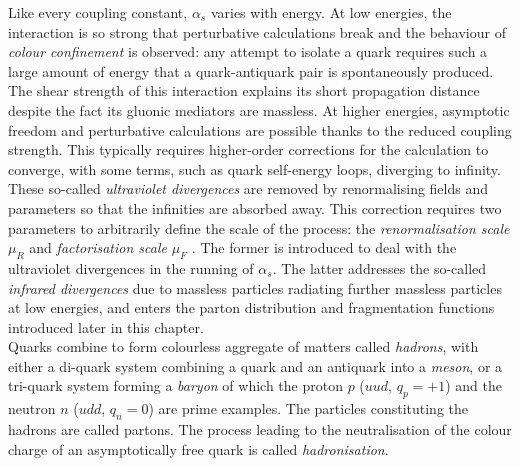 Like every coupling constant, $\alpha_s$ varies with energy. At low energies, the interaction is so strong that perturbative calculations break and the behaviour of \textit{colour confinement} is observed: any attempt to isolate a quark requires such a large amount of energy that a quark-antiquark pair is spontaneously produced. The shear strength of this interaction explains its short propagation distance despite the fact its gluonic mediators are massless. At higher energies, asymptotic freedom and perturbative calculations are possible thanks to the reduced coupling strength. This typically requires higher-order corrections for the calculation to converge, with some terms, such as quark self-energy loops, diverging to infinity. These so-called \textit{ultraviolet divergences} are removed by renormalising fields and parameters so that the infinities are absorbed away. This correction requires two parameters to arbitrarily define the scale of the process: the \textit{renormalisation scale} $\mu_R$ and \textit{factorisation scale} $\mu_F$ \cite{collins2004factorization}. The former is introduced to deal with the ultraviolet divergences in the running of $\alpha_s$. The latter addresses the so-called \textit{infrared divergences} due to massless particles radiating further massless particles at low energies, and enters the parton distribution and fragmentation functions introduced later in this chapter.\\

Quarks combine to form colourless aggregate of matters called \textit{hadrons}, with either a di-quark system combining a quark and an antiquark into a \textit{meson}, or a tri-quark system forming a \textit{baryon} of which the proton $p$ ($uud$, $q_p = +1$) and the neutron $n$ ($udd$, $q_n = 0$) are prime examples. The particles constituting the hadrons are called partons. The process leading to the neutralisation of the colour charge of an asymptotically free quark is called \textit{hadronisation}.

